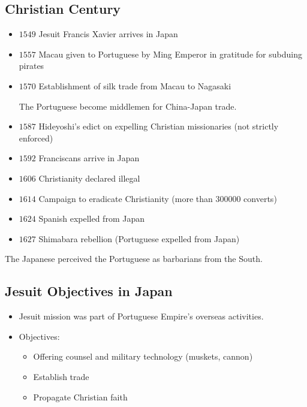 \documentclass[class=article, crop=false]{standalone}
\begin{document}
  \subsection{Christian Century}
  \begin{itemize}
    \item $1549$ Jesuit Francis Xavier arrives in Japan
    \item $1557$ Macau given to Portuguese by Ming Emperor in gratitude for subduing pirates
    \item $1570$ Establishment of silk trade from Macau to Nagasaki
    \begin{note}{}
      The Portuguese become middlemen for China-Japan trade.
    \end{note}
    \item $1587$ Hideyoshi's edict on expelling Christian missionaries (not strictly enforced)
    \item $1592$ Franciscans arrive in Japan
    \item $1606$ Christianity declared illegal
    \item $1614$ Campaign to eradicate Christianity (more than $300000$ converts)
    \item $1624$ Spanish expelled from Japan
    \item $1627$ Shimabara rebellion (Portuguese expelled from Japan)
  \end{itemize}
  \begin{note}{}
    The Japanese perceived the Portuguese as barbarians from the South.
  \end{note}
  \subsection{Jesuit Objectives in Japan}
  \begin{itemize}
    \item Jesuit mission was part of Portuguese Empire's overseas activities.
    \item Objectives:
    \begin{itemize}
      \item Offering counsel and military technology (muskets, cannon)
      \item Establish trade
      \item Propagate Christian faith
    \end{itemize}
  \end{itemize}
\end{document}
